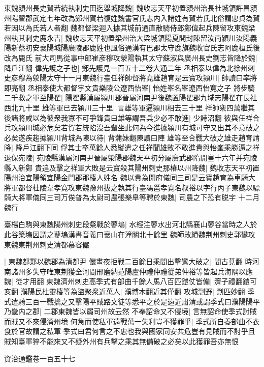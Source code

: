 東魏潁州長史賀若統執刺史田迄舉城降魏|{
	魏收志天平初置潁州治長社城領許昌潁州陽翟郡武定七年改為鄭州賀若復姓魏書官氏志内入諸姓有賀若氏北俗謂忠貞為賀若因以為氏若人者翻}
魏都督梁迴入據其城前通直散騎侍郎鄭偉起兵陳留攻東魏梁州執其刺史鹿永吉|{
	魏收志天平初置梁州治大梁城領陽夏開封陳留汝南潁川汝陽義陽新蔡初安襄陽城陽廣陵郡鹿姓也風俗通漢有巴郡太守鹿旗魏收官氏志阿鹿桓氏後改為鹿氏}
前大司馬從事中郎崔彦穆攻滎陽執其太守蘇淑與廣州長史劉志皆降於魏|{
	降戶江翻}
偉先護之子也|{
	鄭先護見一百五十二卷大通二年}
丞相泰以偉為北徐州刺史彦穆為滎陽太守十一月東魏行臺任祥帥督將堯雄趙育是云寶攻潁川|{
	帥讀曰率將即亮翻}
丞相泰使大都督宇文貴樂陵公遼西怡峯|{
	怡姓峯名峯遼西怡寛之子}
將步騎二千救之軍至陽翟|{
	陽翟縣漢屬潁川郡晉屬河南尹後魏置陽翟郡九域志陽翟在長社西北九十里}
雄等軍已去潁川三十里|{
	言雄等軍逼潁川相去三十里}
祥帥衆四萬繼其後諸將咸以為彼衆我寡不可爭鋒貴曰雄等謂吾兵少必不敢進|{
	少詩沼翻}
彼與任祥合兵攻潁川城必危矣若賀若統陷沒吾輩坐此何為今進據潁川有城可守又出其不意破之必矣遂疾趨據潁川背城為陳以待|{
	背蒲妹翻陳讀曰陣}
雄等至合戰大破之雄走趙育請降|{
	降戶江翻下同}
俘其士卒萬餘人悉縱遣之任祥聞雄敗不敢進貴與怡峯乘勝逼之祥退保宛陵|{
	宛陵縣漢屬河南尹晉屬滎陽郡魏天平初分屬廣武郡隋開皇十六年并宛陵縣入新鄭}
貴追及擊之祥軍大敗是云寶殺其陽州刺史那椿以州降魏|{
	魏收志天平初置陽州治宜陽領宜陽金門郡那椿人姓名}
魏以貴為開府儀同三司是云寶趙育為車騎大將軍都督杜陵韋孝寛攻東魏豫州拔之執其行臺馮邕孝寛名叔裕以字行丙子東魏以驃騎大將軍儀同三司万俟普為太尉司農張樂臯等聘於東魏|{
	司農之下恐有脱宇}
十二月魏行

臺楊白駒與東魏陽州刺史段粲戰於蓼塢|{
	水經注蓼水出河北縣襄山蓼谷當時之人於此谷築塢因謂之蓼塢漢書音義曰襄山在潼關北十餘里}
魏師敗績魏荆州刺史郭鸞攻東魏東荆州刺史清都慕容儼

|{
	東魏都鄴以魏郡為清都尹}
儼晝夜拒戰二百餘日乘間出擊鸞大破之|{
	間古莧翻}
時河南諸州多失守唯東荆獲全河間邢磨納范陽盧仲禮仲禮從弟仲裕等皆起兵海隅以應魏|{
	從才用翻}
東魏濟州刺史高季式有部曲千餘人馬八百匹鎧仗皆備|{
	濟子禮翻鎧可亥翻}
濮陽民杜靈椿等為盜聚衆近萬人|{
	濮博木翻近其僅翻}
攻城剽野|{
	剽匹妙翻}
季式遣騎三百一戰擒之又擊陽平賊路文徒等悉平之於是遠近肅清或謂季式曰濮陽陽平乃畿内之郡|{
	二郡東魏皆以屬司州故云然}
不奉詔命又不侵境|{
	言無詔命使季式討賊而賊又不來侵濟州境}
何急而使私軍遠戰萬一失利豈不獲罪乎|{
	季式所自養部曲不衣食於官故謂之私軍}
季式曰君何言之不忠也我與國家同安共危豈有見賊而不討乎且賊知臺軍猝不能來又不疑外州有兵擊之乘其無備破之必矣以此獲罪吾亦無恨

資治通鑑卷一百五十七
